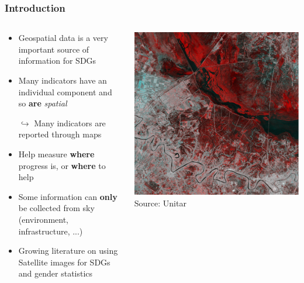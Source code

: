 \documentclass[xcolor=x11names,aspectratio=169, compress]{beamer}
\renewcommand{\(}{\begin{columns}}
\renewcommand{\)}{\end{columns}}
\newcommand{\<}[1]{\begin{column}{#1}}
\renewcommand{\>}{\end{column}}
\begin{document}
\begin{frame}
    \frametitle{Introduction}
    \begin{columns}[T]
        \begin{column}{0.7\textwidth}
            \begin{itemize}[<+->]
                \item Geospatial data is a very important source of information for SDGs
                \item Many indicators have an individual component and so \textbf{are} \emph{spatial}
                \item[$\hookrightarrow$] Many indicators are reported through maps
                \item Help measure \textbf{where} progress is, or \textbf{where} to help
                \item Some information can \textbf{only} be collected from sky (environment, infrastructure, ...)
                \item Growing literature on using Satellite images for SDGs and gender statistics
            \end{itemize}
        \end{column}
        \begin{column}{0.3\textwidth}
            \includegraphics[width=\textwidth]{SpatialImageRed.PNG}
             \textcolor{gris}{\footnotesize{Source: Unitar}}
        \end{column}
    \end{columns}
\end{frame}
\end{document}
